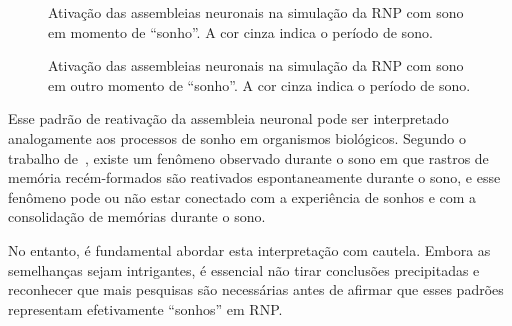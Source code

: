 \begin{figure}[!ht]
\caption{Ativação das assembleias neuronais na simulação da RNP com sono em momento de ``sonho''. A cor cinza indica o período de sono.}
\end{figure}

\begin{figure}[!ht]
\caption{Ativação das assembleias neuronais na simulação da RNP com sono em outro momento de ``sonho''. A cor cinza indica o período de sono.}
\end{figure}

Esse padrão de reativação da assembleia neuronal pode ser interpretado analogamente aos processos de sonho em organismos
biológicos. Segundo o trabalho de~, existe um fenômeno observado durante o sono em que rastros
de memória recém-formados são reativados espontaneamente durante o sono, e esse fenômeno pode ou não estar conectado com a experiência de
sonhos e com a consolidação de memórias durante o sono.

No entanto, é fundamental abordar esta interpretação com cautela. Embora as semelhanças sejam intrigantes, é essencial
não tirar conclusões precipitadas e reconhecer que mais pesquisas são necessárias antes de afirmar que esses padrões representam
efetivamente ``sonhos'' em RNP.\@
